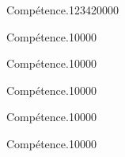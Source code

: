 \begin{pageParcoursu} %

\begin{ExoCu}{Compétence.}{1234}{2}{0}{0}{0}{0}
  
\end{ExoCu}

\begin{ExoCuN}{Compétence.}{1}{0}{0}{0}{0}

\end{ExoCuN}

\begin{ExoCuN}{Compétence.}{1}{0}{0}{0}{0}

\end{ExoCuN}

\begin{ExoCuN}{Compétence.}{1}{0}{0}{0}{0}

\end{ExoCuN}

\begin{ExoCuN}{Compétence.}{1}{0}{0}{0}{0}

\end{ExoCuN}

\begin{ExoCuN}{Compétence.}{1}{0}{0}{0}{0}

\end{ExoCuN}


\end{pageParcoursu} %
 

